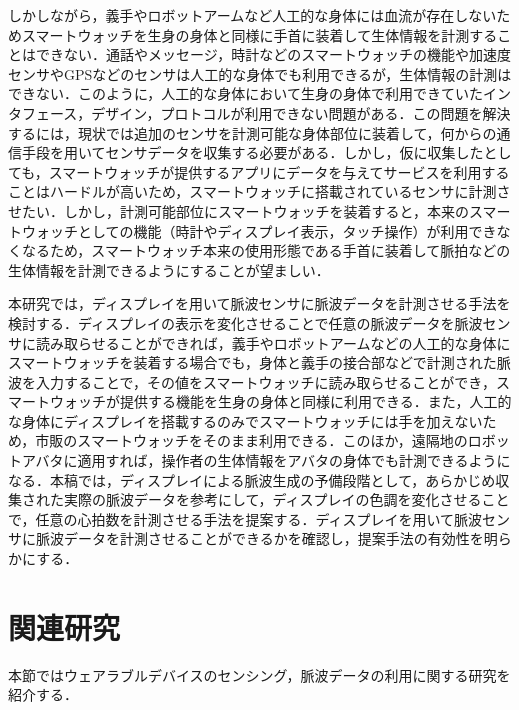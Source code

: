 \documentclass[submit,techrep]{ipsj}
\begin{document}
しかしながら，義手やロボットアームなど人工的な身体には血流が存在しないためスマートウォッチを生身の身体と同様に手首に装着して生体情報を計測することはできない．通話やメッセージ，時計などのスマートウォッチの機能や加速度センサやGPSなどのセンサは人工的な身体でも利用できるが，生体情報の計測はできない．このように，人工的な身体において生身の身体で利用できていたインタフェース，デザイン，プロトコルが利用できない問題がある．この問題を解決するには，現状では追加のセンサを計測可能な身体部位に装着して，何からの通信手段を用いてセンサデータを収集する必要がある．しかし，仮に収集したとしても，スマートウォッチが提供するアプリにデータを与えてサービスを利用することはハードルが高いため，スマートウォッチに搭載されているセンサに計測させたい．しかし，計測可能部位にスマートウォッチを装着すると，本来のスマートウォッチとしての機能（時計やディスプレイ表示，タッチ操作）が利用できなくなるため，スマートウォッチ本来の使用形態である手首に装着して脈拍などの生体情報を計測できるようにすることが望ましい．
\par

本研究では，ディスプレイを用いて脈波センサに脈波データを計測させる手法を検討する．ディスプレイの表示を変化させることで任意の脈波データを脈波センサに読み取らせることができれば，義手やロボットアームなどの人工的な身体にスマートウォッチを装着する場合でも，身体と義手の接合部などで計測された脈波を入力することで，その値をスマートウォッチに読み取らせることができ，スマートウォッチが提供する機能を生身の身体と同様に利用できる．また，人工的な身体にディスプレイを搭載するのみでスマートウォッチには手を加えないため，市販のスマートウォッチをそのまま利用できる．このほか，遠隔地のロボットアバタに適用すれば，操作者の生体情報をアバタの身体でも計測できるようになる．本稿では，ディスプレイによる脈波生成の予備段階として，あらかじめ収集された実際の脈波データを参考にして，ディスプレイの色調を変化させることで，任意の心拍数を計測させる手法を提案する．ディスプレイを用いて脈波センサに脈波データを計測させることができるかを確認し，提案手法の有効性を明らかにする．
\par



\section{関連研究}
\label{related}
本節ではウェアラブルデバイスのセンシング，脈波データの利用に関する研究を紹介する．
\end{document}
